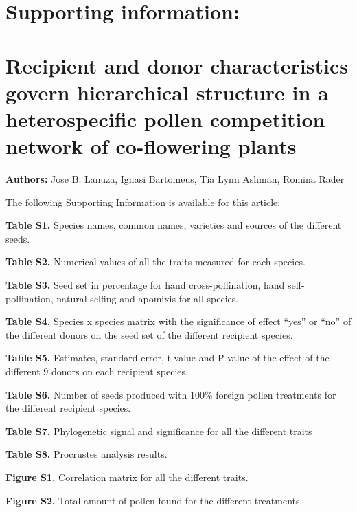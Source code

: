 \documentclass[
  12pt,
]{article}
\author{}
\date{\vspace{-2.5em}}
\begin{document}
\hypertarget{supporting-information}{%
\section{Supporting information:}\label{supporting-information}}

\hypertarget{recipient-and-donor-characteristics-govern-hierarchical-structure-in-a-heterospecific-pollen-competition-network-of-co-flowering-plants}{%
\section{Recipient and donor characteristics govern hierarchical
structure in a heterospecific pollen competition network of co-flowering
plants}\label{recipient-and-donor-characteristics-govern-hierarchical-structure-in-a-heterospecific-pollen-competition-network-of-co-flowering-plants}}

\textbf{Authors:} Jose B. Lanuza, Ignasi Bartomeus, Tia Lynn Ashman,
Romina Rader

The following Supporting Information is available for this article:

\textbf{Table S1.} Species names, common names, varieties and sources of
the different seeds.

\textbf{Table S2.} Numerical values of all the traits measured for each
species.

\textbf{Table S3.} Seed set in percentage for hand cross-pollination,
hand self-pollination, natural selfing and apomixis for all species.

\textbf{Table S4.} Species x species matrix with the significance of
effect ``yes'' or ``no'' of the different donors on the seed set of the
different recipient species.

\textbf{Table S5.} Estimates, standard error, t-value and P-value of the
effect of the different 9 donors on each recipient species.

\textbf{Table S6.} Number of seeds produced with 100\% foreign pollen
treatments for the different recipient species.

\textbf{Table S7.} Phylogenetic signal and significance for all the
different traits

\textbf{Table S8.} Procrustes analysis results.

\textbf{Figure S1.} Correlation matrix for all the different traits.

\textbf{Figure S2.} Total amount of pollen found for the different
treatments.
\end{document}
